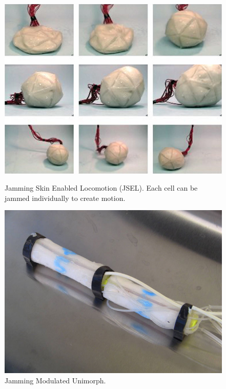 \begin{figure}[h]
  \centering
  \begin{minipage}[t]{.45\textwidth}
    \centering
    \includegraphics[width=.9\linewidth]{figures/jamming/chembot-robot-blob}
    \caption[Jamming Skin Enabled Locomotion (JSEL) by \citet{steltz2009jsel}.]
    {Jamming Skin Enabled Locomotion (JSEL). Each cell can be jammed individually to create motion.}
    \label{fig:ch:jamming:jsel}
    \hspace{.2\textwidth} 
  \end{minipage}%
  \hspace{0.5cm}
  \begin{minipage}[t]{.45\textwidth}
    \centering
    \includegraphics[width=.9\linewidth]{figures/jamming/jmu-worm}
    \caption[Jamming Modulated Unimorph by \citet{steltz2010jamming}.]
    {Jamming Modulated Unimorph.}
    \label{fig:ch:jamming:jmu}
  \end{minipage}
\end{figure}


